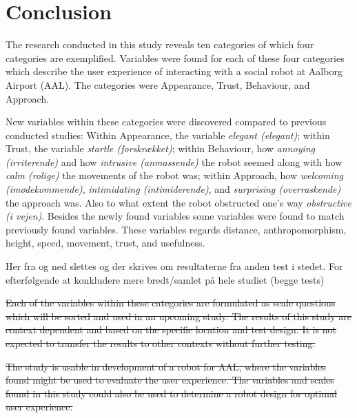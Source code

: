 \section{Conclusion}
\label{Conclusion}
%
The research conducted in this study reveals ten categories of which four categories are exemplified. Variables were found for each of these four categories which describe the user experience of interacting with a social robot at Aalborg Airport (AAL). The categories were Appearance, Trust, Behaviour, and Approach.

New variables within these categories were discovered compared to previous conducted studies: Within Appearance, the variable \textit{elegant (elegant)}; within Trust, the variable \textit{startle (forskrækket)}; within Behaviour, how \textit{annoying (irriterende)} and how \textit{intrusive (anmassende)} the robot seemed along with how \textit{calm (rolige)} the movements of the robot was; within Approach, how \textit{welcoming (imødekommende)}, \textit{intimidating (intimiderende)}, and \textit{surprising (overraskende)} the approach was. Also to what extent the robot obstructed one's way \textit{obstructive (i vejen)}. Besides the newly found variables some variables were found to match previously found variables. These variables regards distance, anthropomorphism, height, speed, movement, trust, and usefulness.

{\color{red} Her fra og ned slettes og der skrives om resultaterne fra anden test i stedet. For efterfølgende at konkludere mere bredt/samlet på hele studiet (begge tests)}

\sout{Each of the variables within these categories are formulated as scale questions which will be sorted and used in an upcoming study. The results of this study are context dependent and based on the specific location and test design. It is not expected to transfer the results to other contexts without further testing. }

\sout{The study is usable in development of a robot for AAL, where the variables found might be used to evaluate the user experience. The variables and scales found in this study could also be used to determine a robot design for optimal user experience.}

